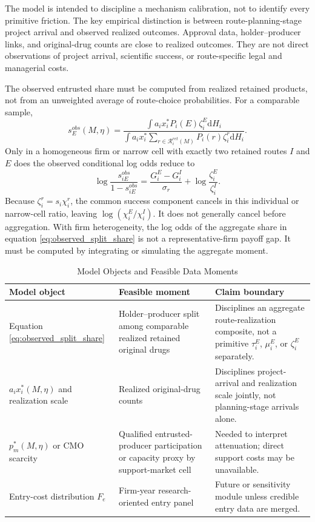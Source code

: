\documentclass[12pt]{article}
\newcommand{\1}{\mathbf{1}}
\newcommand{\dd}{\mathrm{d}}
\newcommand{\calR}{\mathcal{R}}
\begin{document}
The model is intended to discipline a mechanism calibration, not to identify every primitive friction. The key empirical distinction is between route-planning-stage project arrival and observed realized outcomes. Approval data, holder--producer links, and original-drug counts are close to realized outcomes. They are not direct observations of project arrival, scientific success, or route-specific legal and managerial costs.

The observed entrusted share must be computed from realized retained products, not from an unweighted average of route-choice probabilities. For a comparable sample,
\begin{equation}
    s_E^{obs}(M,\eta)
    =
    \frac{\int a_i x_i^*P_i(E)\zeta_i^E\dd H_i}
    {\int a_i x_i^*\sum_{r\in\calR_i^{ret}(M)}P_i(r)\zeta_i^r\dd H_i}.
    \label{eq:observed_split_share}
\end{equation}
Only in a homogeneous firm or narrow cell with exactly two retained routes $I$ and $E$ does the observed conditional log odds reduce to
\begin{equation}
    \log\frac{s_{iE}^{obs}}{1-s_{iE}^{obs}}
    =\frac{G_i^E-G_i^I}{\sigma_r}
     +\log\frac{\zeta_i^E}{\zeta_i^I}.
    \label{eq:observed_log_odds}
\end{equation}
Because $\zeta_i^r=s_i\chi_i^r$, the common success component cancels in this individual or narrow-cell ratio, leaving $\log(\chi_i^E/\chi_i^I)$. It does not generally cancel before aggregation.
With firm heterogeneity, the log odds of the aggregate share in equation \eqref{eq:observed_split_share} is not a representative-firm payoff gap. It must be computed by integrating or simulating the aggregate moment.

\begin{table}[htbp]
\centering
\footnotesize
\caption{Model Objects and Feasible Data Moments}
\label{tab:model_data_mapping}
\begin{tabularx}{\textwidth}{L{0.28\textwidth}Y Y}
\toprule
Model object & Feasible moment & Claim boundary \\
\midrule
Equation \eqref{eq:observed_split_share} & Holder--producer split among comparable realized retained original drugs & Disciplines an aggregate route-realization composite, not a primitive $\tau_i^E$, $\mu_i^E$, or $\zeta_i^E$ separately. \\
$a_i x_i^*(M,\eta)$ and realization scale & Realized original-drug counts & Disciplines project-arrival and realization scale jointly, not planning-stage arrivals alone. \\
$p_m^*(M,\eta)$ or CMO scarcity & Qualified entrusted-producer participation or capacity proxy by support-market cell & Needed to interpret attenuation; direct support costs may be unavailable. \\
Entry-cost distribution $F_e$ & Firm-year research-oriented entry panel & Future or sensitivity module unless credible entry data are merged. \\
\bottomrule
\end{tabularx}
\end{table}
\end{document}
